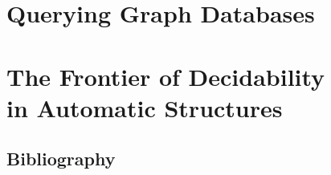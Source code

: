 \documentclass[a4paper,sfsidenotes,twoside,justified,nobib]{tufte-book-custom}
\begin{document}




\part{Querying Graph Databases}
\label{part:databases}






\part[The Frontier of Decidability in Automatic Structures]{The Frontier of Decidability\\in Automatic Structures}
\label{part:automatic}






\backmatter
\chapter*{Bibliography}
\printbibliography[heading=none]
\end{document}
